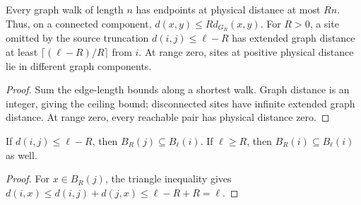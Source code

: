 \begin{lemma}
    \label{thm:hastings05_metric_graph_separation}
    \leanok
    Every graph walk of length $n$ has endpoints at physical distance at
    most $Rn$. Thus, on a connected component,
    $d(x,y)\le R d_{G_R}(x,y)$. For $R>0$, a site omitted by the source
    truncation $d(i,j)\le\ell-R$ has extended graph distance at least
    $\lceil(\ell-R)/R\rceil$ from $i$. At range zero, sites at positive
    physical distance lie in different graph components.
\end{lemma}
\begin{proof}\leanok
    Sum the edge-length bounds along a shortest walk. Graph distance is an
    integer, giving the ceiling bound; disconnected sites have infinite
    extended graph distance. At range zero, every reachable pair has
    physical distance zero.
\end{proof}

\begin{lemma}
    \label{thm:hastings05_metric_retained_support}
    \leanok
    If $d(i,j)\le\ell-R$, then $B_R(j)\subseteq B_\ell(i)$.
    If $\ell\ge R$, then $B_R(i)\subseteq B_\ell(i)$ as well.
\end{lemma}
\begin{proof}\leanok
    For $x\in B_R(j)$, the triangle inequality gives
    $d(i,x)\le d(i,j)+d(j,x)\le\ell-R+R=\ell$.
\end{proof}
